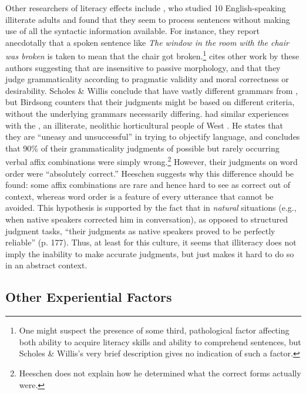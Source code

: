 Other researchers of literacy effects include \citet{Scholes1987},
who studied 10 English-speaking illiterate adults and found that they seem to process sentences without making use of all the syntactic information available. For instance, they report anecdotally that a spoken sentence like \textit{The window in the room with the chair was broken} is taken to mean that the chair got broken.\footnote{One might suspect the presence of some third, pathological factor affecting both ability to acquire literacy skills and ability to comprehend sentences, but Scholes \& Willis's very brief description gives no indication of such a factor.}
\citet{Birdsong1989} cites other work by these authors suggesting that  are insensitive to passive morphology, and that they judge grammaticality according to pragmatic validity and moral correctness or desirability. Scholes \& Willis conclude that  have vastly different grammars from , but Birdsong counters that their judgments might be based on different criteria, without the underlying grammars necessarily differing. \citet{Heeschen1978} had similar experiences with the , an illiterate, neolithic horticultural people of West . He states that they are ``uneasy and unsuccessful'' in trying to objectify language, and concludes that 90\% of their grammaticality judgments of possible but rarely occurring verbal affix combinations were simply wrong.\footnote{Heeschen does not explain how he determined what the correct forms actually were.}
 However, their judgments on word order were ``absolutely correct.'' Heeschen suggests why this difference should be found: some affix combinations are rare and hence hard to see as correct out of context, whereas word order is a feature of every utterance that cannot be avoided. This hypothesis is supported by the fact that in \textit{natural} situations (e.g., when native speakers corrected him in conversation), as opposed to structured judgment tasks, ``their judgments as native speakers proved to be perfectly reliable'' (p. 177). Thus, at least for this culture, it seems that illiteracy does not imply the inability to make accurate judgments, but just makes it hard to do so in an abstract context.

\subsection{ Other Experiential Factors} \label{sec:4.4.3}

